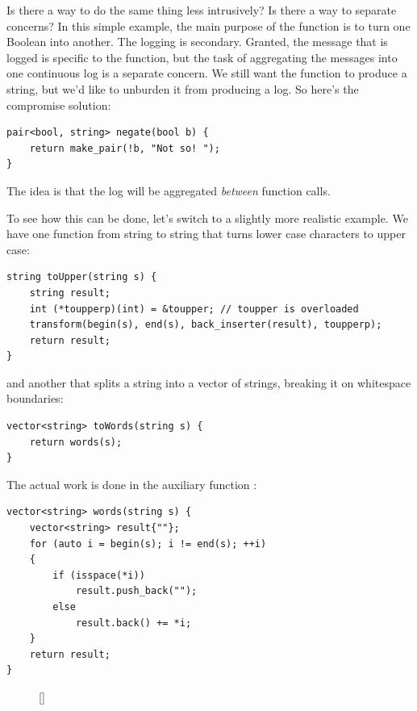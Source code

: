 Is there a way to do the same thing less intrusively? Is there a way to
separate concerns? In this simple example, the main purpose of the
function  is to turn one Boolean into another. The
logging is secondary. Granted, the message that is logged is specific to
the function, but the task of aggregating the messages into one
continuous log is a separate concern. We still want the function to
produce a string, but we'd like to unburden it from producing a log. So
here's the compromise solution:

\begin{verbatim}
pair<bool, string> negate(bool b) {
    return make_pair(!b, "Not so! ");
}
\end{verbatim}

The idea is that the log will be aggregated \emph{between} function
calls.

To see how this can be done, let's switch to a slightly more realistic
example. We have one function from string to string that turns lower
case characters to upper case:

\begin{verbatim}
string toUpper(string s) {
    string result;
    int (*toupperp)(int) = &toupper; // toupper is overloaded
    transform(begin(s), end(s), back_inserter(result), toupperp);
    return result;
}
\end{verbatim}

and another that splits a string into a vector of strings, breaking it
on whitespace boundaries:

\begin{verbatim}
vector<string> toWords(string s) {
    return words(s);
}
\end{verbatim}

The actual work is done in the auxiliary function :

\begin{verbatim}
vector<string> words(string s) {
    vector<string> result{""};
    for (auto i = begin(s); i != end(s); ++i)
    {
        if (isspace(*i))
            result.push_back(""); 
        else
            result.back() += *i;
    }
    return result;
}
\end{verbatim}

\begin{figure}
\raisebox{0pt}[\dimexpr{}\baselineskip\relax]{
  }%
\end{figure}

